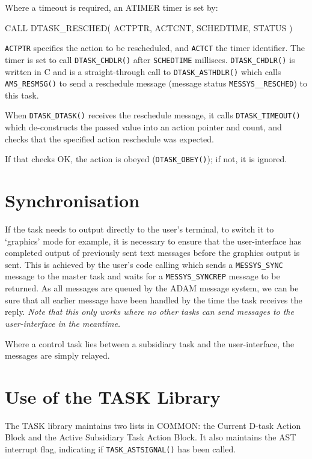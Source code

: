 \documentclass[twoside,11pt,nolof]{starlink}
\begin{document}
Where a timeout is required, an ATIMER timer is set by:
\begin{terminalv}
CALL DTASK_RESCHED( ACTPTR, ACTCNT, SCHEDTIME, STATUS )
\end{terminalv}

\texttt{ACTPTR} specifies the action to be rescheduled, and \texttt{ACTCT}
the timer identifier.
The timer is set to call \texttt{DTASK\_CHDLR()} after \texttt{SCHEDTIME}
millisecs. \texttt{DTASK\_CHDLR()} is written in C and is a straight-through
call to \texttt{DTASK\_ASTHDLR()} which calls \texttt{AMS\_RESMSG()} to
send a reschedule message (message status \texttt{MESSYS\_\_RESCHED}) to this
task.

When \texttt{DTASK\_DTASK()} receives the  reschedule message, it calls
\texttt{DTASK\_TIMEOUT()} which de-constructs the passed value into an action
pointer and count, and checks that the specified action reschedule was
expected.

If that checks OK, the action is obeyed (\texttt{DTASK\_OBEY()}); if not, it is
ignored.

\section{\label{synchronisation}Synchronisation}
If the task needs to output directly to the user's terminal, to switch it to
`graphics' mode for example, it is necessary to ensure that the user-interface
has completed output of previously sent text messages before the graphics
output is sent. This is achieved by the user's code calling
which sends a \texttt{MESSYS\_SYNC} message to the master task and waits for a
\texttt{MESSYS\_SYNCREP} message to be returned. As all messages are queued by
the ADAM message system, we can be sure that all earlier message have been
handled by the time the task receives the reply. \emph{Note that this only
works where no other tasks can send messages to the user-interface in the
meantime.}

Where a control task lies between a subsidiary task and the user-interface,
the messages are simply relayed.

\section{Use of the TASK Library}
The TASK library maintains two lists in COMMON: the Current D-task Action Block
and the Active Subsidiary Task Action Block.
It also maintains the AST interrupt flag, indicating if
\texttt{TASK\_ASTSIGNAL()} has been called.
\end{document}

